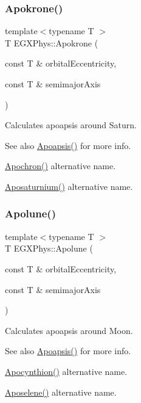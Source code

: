 \subsubsection{\texorpdfstring{Apokrone()}{Apokrone()}}
{\footnotesize\ttfamily template$<$typename T $>$ \\
T E\+G\+X\+Phys\+::\+Apokrone (\begin{DoxyParamCaption}\item[{const T \&}]{orbital\+Eccentricity,  }\item[{const T \&}]{semimajor\+Axis }\end{DoxyParamCaption})}



Calculates apoapsis around Saturn. 

\begin{DoxySeeAlso}{See also}
\mbox{\hyperlink{group___e_g_x_phys-_apoapsis_gaf962e650bf84a568458e8eb39b1c61ba}{Apoapsis()}} for more info. 

\mbox{\hyperlink{group___e_g_x_phys-_apoapsis_gae4ea146039e6f32022321f0998e715e8}{Apochron()}} alternative name. 

\mbox{\hyperlink{group___e_g_x_phys-_apoapsis_gac157adc20a88c8616e4822eb819f9016}{Aposaturnium()}} alternative name. 
\end{DoxySeeAlso}
\mbox{\label{group___e_g_x_phys-_apoapsis_gacc68b49812c38394611e1ef3a8bf0e3e}} 
\subsubsection{\texorpdfstring{Apolune()}{Apolune()}}
{\footnotesize\ttfamily template$<$typename T $>$ \\
T E\+G\+X\+Phys\+::\+Apolune (\begin{DoxyParamCaption}\item[{const T \&}]{orbital\+Eccentricity,  }\item[{const T \&}]{semimajor\+Axis }\end{DoxyParamCaption})}



Calculates apoapsis around Moon. 

\begin{DoxySeeAlso}{See also}
\mbox{\hyperlink{group___e_g_x_phys-_apoapsis_gaf962e650bf84a568458e8eb39b1c61ba}{Apoapsis()}} for more info. 

\mbox{\hyperlink{group___e_g_x_phys-_apoapsis_ga557bb4d1a0ce7f17aaa8f8de469d4f52}{Apocynthion()}} alternative name. 

\mbox{\hyperlink{group___e_g_x_phys-_apoapsis_gab61f3b2d6a5be3f62f5fb6dfdf802014}{Aposelene()}} alternative name. 
\end{DoxySeeAlso}
\mbox{\label{group___e_g_x_phys-_apoapsis_ga83e866e2f887ff8eafbc3971d4cab8be}} 
